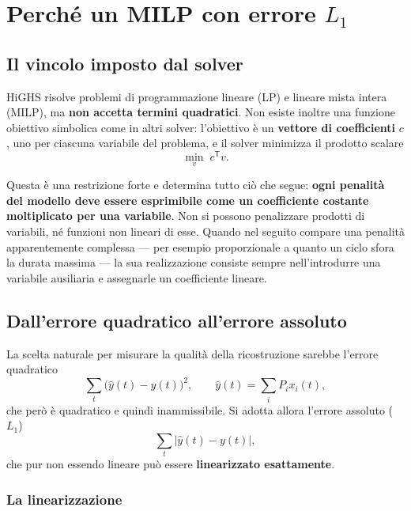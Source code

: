 \chapter{Perché un MILP con errore \texorpdfstring{$L_1$}{L1}}
\label{ch:perche-l1}

\section{Il vincolo imposto dal solver}

HiGHS risolve problemi di programmazione lineare (LP) e lineare mista intera (MILP), ma
\textbf{non accetta termini quadratici}. Non esiste inoltre una funzione obiettivo simbolica come
in altri solver: l'obiettivo è un \textbf{vettore di coefficienti} $c$, uno per ciascuna variabile
del problema, e il solver minimizza il prodotto scalare
\begin{equation}
  \min_{v} \; c^{\mathsf{T}} v .
\end{equation}

Questa è una restrizione forte e determina tutto ciò che segue: \textbf{ogni penalità del modello
deve essere esprimibile come un coefficiente costante moltiplicato per una variabile}. Non si
possono penalizzare prodotti di variabili, né funzioni non lineari di esse. Quando nel seguito
compare una penalità apparentemente complessa --- per esempio proporzionale a quanto un ciclo
sfora la durata massima --- la sua realizzazione consiste sempre nell'introdurre una variabile
ausiliaria e assegnarle un coefficiente lineare.

\section{Dall'errore quadratico all'errore assoluto}

La scelta naturale per misurare la qualità della ricostruzione sarebbe l'errore quadratico
\begin{equation}
  \sum_{t} \bigl( \hat{y}(t) - y(t) \bigr)^2 ,
  \qquad
  \hat{y}(t) = \sum_i P_i x_i(t),
\end{equation}
che però è quadratico e quindi inammissibile. Si adotta allora l'errore assoluto ($L_1$)
\begin{equation}
  \sum_{t} \bigl| \hat{y}(t) - y(t) \bigr| ,
\end{equation}
che pur non essendo lineare può essere \textbf{linearizzato esattamente}.

\subsection{La linearizzazione}

